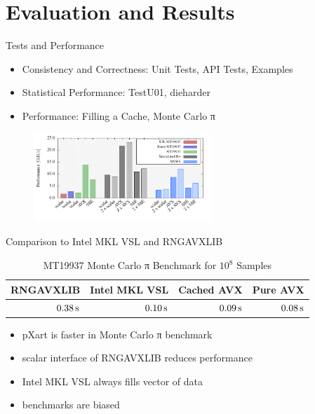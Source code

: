\documentclass[aspectratio=169]{beamer}
\begin{document}
  \section{Evaluation and Results} %
  \label{sec:evaluation_and_results}
    \begin{frame}{Tests and Performance}
      \begin{itemize}
        \pause
        \item Consistency and Correctness: Unit Tests, API Tests, Examples
        \pause
        \item Statistical Performance: TestU01, dieharder
        \pause
        \item Performance: Filling a Cache, Monte Carlo π
      \end{itemize}
      \begin{figure}
        \includegraphics[width=0.6\textwidth]{figures/generation_desktop.pdf}
      \end{figure}
    \end{frame}

    \begin{frame}{Comparison to Intel MKL VSL and RNGAVXLIB}
      \begin{table}
        \caption{MT19937 Monte Carlo π Benchmark for $10^8$ Samples}
        \begin{tabular}{rrrr}
          \hline
          RNGAVXLIB & Intel MKL VSL & Cached AVX & Pure AVX \\
          \hline
          \hline
          $0.38\, \mathrm{s}$ & $0.10\, \mathrm{s}$ & $0.09\, \mathrm{s}$ & $0.08\, \mathrm{s}$ \\
          \hline
        \end{tabular}
      \end{table}
      \bigskip
      \begin{itemize}
        \pause
        \item pXart is faster in Monte Carlo π benchmark
        \pause
        \item scalar interface of RNGAVXLIB reduces performance
        \pause
        \item Intel MKL VSL always fills vector of data
        \pause
        \item benchmarks are biased
      \end{itemize}
    \end{frame}
\end{document}
